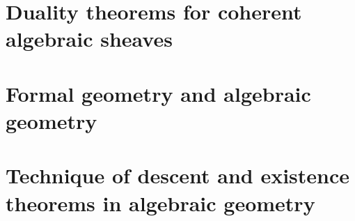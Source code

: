 \documentclass[10pt, oneside]{book}
\begin{document}
% 

\frontmatter


\restoregeometry

\clearpage

\tableofcontents



\mainmatter

\part{Duality theorems for coherent algebraic sheaves}



\part{Formal geometry and algebraic geometry}



\part{Technique of descent and existence theorems in algebraic geometry}\label{fga3}








\backmatter




\cleardoublepage
\end{document}

